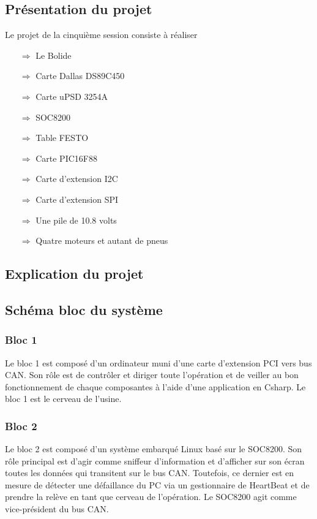 \documentclass[10pt,a4paper,final]{article}
\begin{document}
\renewcommand\footrulewidth{1pt}
\fancyfoot[R]{\today}
\begin{spacing}{1.5}

\section{Présentation du projet}
Le projet de la cinquième session consiste à réaliser
\begin{itemize}
\item[$\Rightarrow$] Le Bolide
\item[$\Rightarrow$] Carte Dallas DS89C450
\item[$\Rightarrow$] Carte uPSD 3254A
\item[$\Rightarrow$] SOC8200
\item[$\Rightarrow$] Table FESTO
\item[$\Rightarrow$] Carte PIC16F88
\item[$\Rightarrow$] Carte d'extension I{\small 2}C
\item[$\Rightarrow$] Carte d'extension SPI
\item[$\Rightarrow$] Une pile de 10.8 volts
\item[$\Rightarrow$] Quatre moteurs et autant de pneus
\end{itemize}

\subsection{Explication du projet}

\subsection{Schéma bloc du système}
\subsubsection{Bloc 1}
Le bloc 1 est composé d'un ordinateur muni d'une carte d'extension PCI vers bus CAN. Son rôle est de contrôler et diriger toute l'opération et de veiller au bon fonctionnement de chaque composantes à l'aide d'une application en Csharp. Le bloc 1 est le cerveau de l'usine.
 
\subsubsection{Bloc 2}
Le bloc 2 est composé d'un système embarqué Linux basé sur le SOC8200. Son rôle principal est d'agir comme sniffeur d'information et d'afficher sur son écran toutes les données qui transitent sur le bus CAN. Toutefois, ce dernier est en mesure de détecter une défaillance du PC via un gestionnaire de HeartBeat et de prendre la relève en tant que cerveau de l'opération. Le SOC8200 agit comme vice-président du bus CAN.


\end{spacing}
\end{document}
